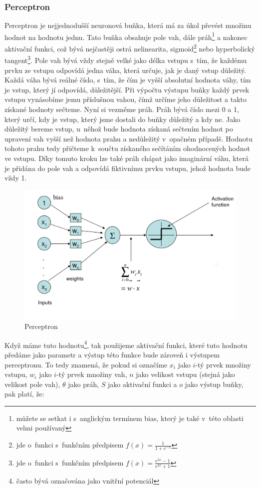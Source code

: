 \documentclass[a4paper]{article}
\begin{document}
 \subsubsection{Perceptron}
Perceptron je nejjednodušší neuronová buňka, která má za úkol převést množinu hodnot na hodnotu jednu. Tato buňka obsahuje pole vah, dále práh\footnote{můžete se setkat i s~anglickým termínem bias, který je také v~této oblasti velmi používaný} a nakonec aktivační funkci, což bývá nejčastěji ostrá nelinearita, sigmoid\footnote{jde o~funkci s~funkčním předpisem  $f(x) = \frac{1}{1 + e^{-x}}$} nebo hyperbolický tangent\footnote{jde o~funkci s~funkčním předpisem $f(x) = \frac{e^{2x} - 1}{e^{2x} + 1}$}. Pole vah bývá vždy stejně velké jako délka vstupu s~tím, že každému prvku ze vstupu odpovídá jedna váha, která určuje, jak je daný vstup důležitý. Každá váha bývá reálné číslo, s~tím, že čím je vyšší absolutní hodnota váhy, tím je vstup, který jí odpovídá, důležitější. Při výpočtu výstupu buňky každý prvek vstupu vynásobíme jemu příslušnou vahou, čímž určíme jeho důležitost a takto získané hodnoty sečteme. Nyní si vezměme práh. Práh bývá číslo mezi 0 a 1, který určí, kdy je vstup, který jsme dostali do buňky důležitý a kdy ne. Jako důležitý bereme vstup, u~něhož bude hodnota získaná sečtením hodnot po upravení vah vyšší než hodnota prahu a nedůležitý v~opačném případě. Hodnotu tohoto prahu tedy přičteme k~součtu získaného sečítáním ohodnocených hodnot ve vstupu. Díky tomuto kroku lze také práh chápat jako imaginární váhu, která je přidána do pole vah a odpovídá fiktivnímu prvku vstupu, jehož hodnota bude vždy 1. \par 
\begin{figure}[h]
	\includegraphics[width=14cm]{40-4}
	\caption{Perceptron}
	\label{odkaz}
	\centering
\end{figure}
\clearpage					      
Když máme tuto hodnotu\footnote{často bývá označována jako vnitřní potenciál}, tak použijeme aktivační funkci, které tuto hodnotu předáme jako parametr a výstup této funkce bude zároveň i výstupem perceptronu. To tedy znamená, že pokud si označíme $x_i$ jako $i$-tý prvek množiny vstupu, $w_i$ jako $i$-tý prvek množiny vah, $n$ jako velikost vstupu (stejná jako velikost pole vah), $\theta$ jako práh, $S$ jako aktivační funkci a $o$ jako výstup buňky, pak platí, že:
\end{document}
